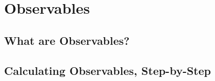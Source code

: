 \documentclass[../../Quantum-Technologies-Notes]{subfiles}
\begin{document}
	
	\ifSubfilesClassLoaded{ \pagestyle{fancy} }
	
	\section{Observables}
		
		\subsection{What are Observables?}
		
		
		\subsection{Calculating Observables, Step-by-Step}
\end{document}
